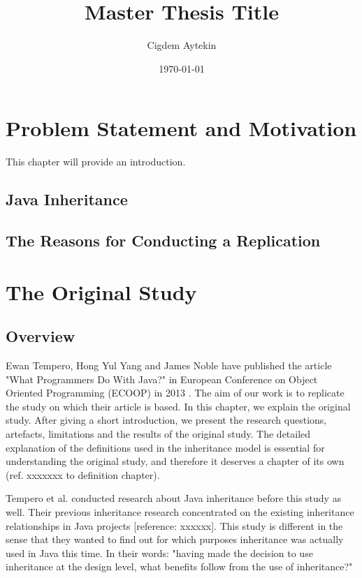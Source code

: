 \documentclass{uvamscse}
\title{Master Thesis Title}
\author{Cigdem Aytekin}
\date{\today}
\begin{document}
\maketitle


\chapter{Problem Statement and Motivation}
This chapter will provide an introduction.

\section{Java Inheritance}


\section{The Reasons for Conducting a Replication}



\chapter{The Original Study}
\section{Overview}

Ewan Tempero, Hong Yul Yang and James Noble have published the article "What Programmers Do With Java?" in European Conference on Object Oriented Programming (ECOOP) in 2013 \cite{DBLP:conf/ecoop/TemperoYN13}. The aim of our work is to replicate the study on which their article is based. In this chapter, we explain the original study. After giving a short introduction, we present the research questions, artefacts, limitations and the results of the original study. The detailed explanation of the definitions used in the inheritance model is essential for understanding the original study, and therefore it deserves a chapter of its own (ref. xxxxxxx to definition chapter). 

Tempero et al. conducted research about Java inheritance before this study as well. Their previous inheritance research concentrated on the existing inheritance relationships in Java projects [reference: xxxxxx]. This study is different in the sense that they wanted to find out for which purposes inheritance was actually used in Java this time. In their words: "having made the decision to use inheritance at the design level, what benefits follow from the use of inheritance?" 
\end{document}
